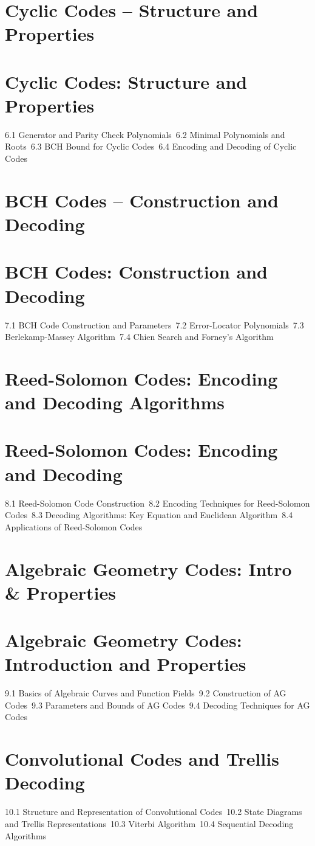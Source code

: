 \section{Cyclic Codes – Structure and Properties}
\section{Cyclic Codes: Structure and Properties}
6.1 Generator and Parity Check Polynomials\
6.2 Minimal Polynomials and Roots\
6.3 BCH Bound for Cyclic Codes\
6.4 Encoding and Decoding of Cyclic Codes\
\section{BCH Codes – Construction and Decoding}
\section{BCH Codes: Construction and Decoding}
7.1 BCH Code Construction and Parameters\
7.2 Error-Locator Polynomials\
7.3 Berlekamp-Massey Algorithm\
7.4 Chien Search and Forney's Algorithm\
\section{Reed-Solomon Codes: Encoding and Decoding Algorithms}
\section{Reed-Solomon Codes: Encoding and Decoding}
8.1 Reed-Solomon Code Construction\
8.2 Encoding Techniques for Reed-Solomon Codes\
8.3 Decoding Algorithms: Key Equation and Euclidean Algorithm\
8.4 Applications of Reed-Solomon Codes\
\section{Algebraic Geometry Codes: Intro \& Properties}
\section{Algebraic Geometry Codes: Introduction and Properties}
9.1 Basics of Algebraic Curves and Function Fields\
9.2 Construction of AG Codes\
9.3 Parameters and Bounds of AG Codes\
9.4 Decoding Techniques for AG Codes\
\section{Convolutional Codes and Trellis Decoding}
10.1 Structure and Representation of Convolutional Codes\
10.2 State Diagrams and Trellis Representations\
10.3 Viterbi Algorithm\
10.4 Sequential Decoding Algorithms\
